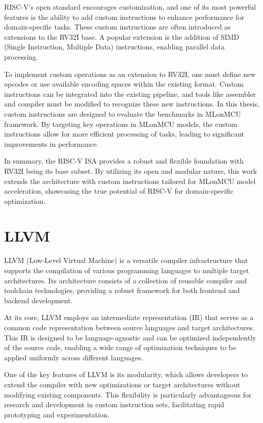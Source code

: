 RISC-V's open standard encourages customization, and one of its most powerful features is the ability to add custom instructions to enhance performance for domain-specific tasks. These custom instructions are often introduced as extensions to the RV32I base. A popular extension is the addition of SIMD (Single Instruction, Multiple Data) instructions, enabling parallel data processing.

To implement custom operations as an extension to RV32I, one must define new opcodes or use available encoding spaces within the existing format. Custom instructions can be integrated into the existing pipeline, and tools like assembler and compiler must be modified to recognize these new instructions. In this thesis, custom instructions are designed to evaluate the benchmarks in MLonMCU framework. By targeting key operations in MLonMCU models, the custom instructions allow for more efficient processing of tasks, leading to significant improvements in performance.

In summary, the RISC-V ISA provides a robust and flexible foundation with RV32I being its base subset. By utilizing its open and modular nature, this work extends the architecture with custom instructions tailored for MLonMCU model acceleration, showcasing the true potential of RISC-V for domain-specific optimization.

\section{LLVM}

LLVM (Low-Level Virtual Machine) is a versatile compiler infrastructure that supports the compilation of various programming languages to multiple target architectures. Its architecture consists of a collection of reusable compiler and toolchain technologies, providing a robust framework for both frontend and backend development.

At its core, LLVM employs an intermediate representation (IR) that serves as a common code representation between source languages and target architectures. This IR is designed to be language-agnostic and can be optimized independently of the source code, enabling a wide range of optimization techniques to be applied uniformly across different languages.

One of the key features of LLVM is its modularity, which allows developers to extend the compiler with new optimizations or target architectures without modifying existing components. This flexibility is particularly advantageous for research and development in custom instruction sets, facilitating rapid prototyping and experimentation.

